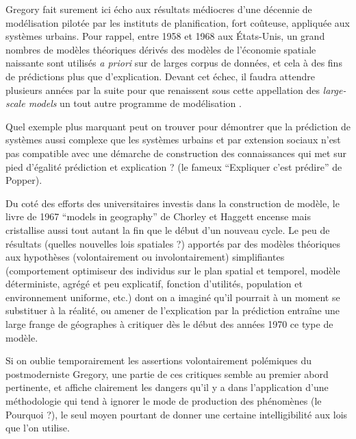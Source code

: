 Gregory fait surement ici écho aux résultats médiocres \autocite{Lee1973} d'une décennie de modélisation pilotée par les instituts de planification, fort coûteuse, appliquée aux systèmes urbains. Pour rappel, entre 1958 et 1968 aux États-Unis, un grand nombres de modèles théoriques \autocite[7-9]{Batty1979} dérivés des modèles de l'économie spatiale naissante sont utilisés \textit{a priori} sur de larges corpus de données, et cela à des fins de prédictions plus que d'explication. Devant cet échec, il faudra attendre plusieurs années par la suite pour que renaissent sous cette appellation des \textit{large-scale models} un tout autre programme de modélisation \autocite{Boyce1988}.

Quel exemple plus marquant peut on trouver pour démontrer que la prédiction de systèmes aussi complexe que les systèmes urbains et par extension sociaux n'est pas compatible avec une démarche de construction des connaissances qui met sur pied d'égalité prédiction et explication ? (le fameux \enquote{Expliquer c'est prédire} de Popper).

Du coté des efforts des universitaires investis dans la construction de modèle, le livre de 1967 \foreignquote{english}{models in geography} de Chorley et Haggett encense mais cristallise aussi \textcite{Golledge2006} tout autant la fin que le début d'un nouveau cycle. Le peu de résultats (quelles nouvelles lois spatiales ?) apportés par des modèles théoriques aux hypothèses (volontairement ou involontairement) simplifiantes (comportement optimiseur des individus sur le plan spatial et temporel, modèle déterministe, agrégé et peu explicatif, fonction d'utilités, population et environnement uniforme, etc.) dont on a imaginé qu'il pourrait à un moment se substituer à la réalité, ou amener de l'explication par la prédiction \autocite[41]{Gregory1978} entraîne une large frange de géographes à critiquer dès le début des années 1970 ce type de modèle.

Si on oublie temporairement les assertions volontairement polémiques du postmoderniste Gregory, une partie de ces critiques semble au premier abord pertinente, et affiche clairement les dangers qu'il y a dans l'application d'une méthodologie qui tend à ignorer le mode de production des phénomènes (le Pourquoi ?), le seul moyen pourtant de donner une certaine intelligibilité aux lois que l'on utilise. \autocite[14-15]{Besse2000}


